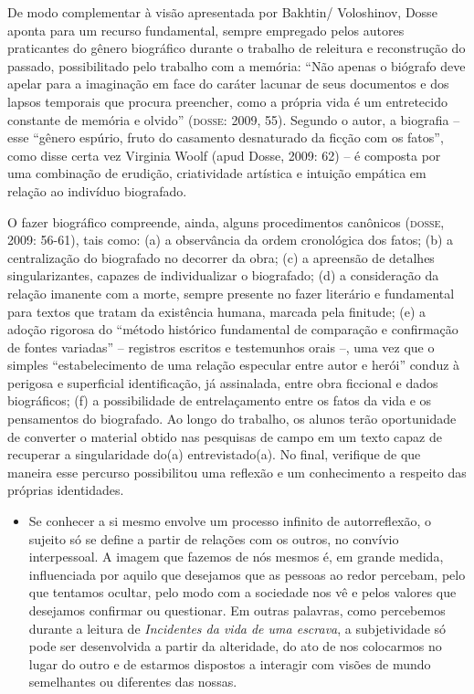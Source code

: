 \documentclass[12pt]{extarticle}
\begin{document}
De modo complementar à visão apresentada por Bakhtin/ Voloshinov, Dosse
aponta para um recurso fundamental, sempre empregado pelos autores
praticantes do gênero biográfico durante o trabalho de releitura e
reconstrução do passado, possibilitado pelo trabalho com a memória: ``Não
apenas o biógrafo deve apelar para a imaginação em face do caráter
lacunar de seus documentos e dos lapsos temporais que procura preencher,
como a própria vida é um entretecido constante de memória e olvido''
(\textsc{dosse}: 2009, 55). Segundo o autor, a biografia -- esse ``gênero espúrio,
fruto do casamento desnaturado da ficção com os fatos'', como disse certa
vez Virginia Woolf (apud Dosse, 2009: 62) -- é composta por uma
combinação de erudição, criatividade artística e intuição empática em
relação ao indivíduo biografado.

O fazer biográfico compreende, ainda, alguns procedimentos canônicos
(\textsc{dosse}, 2009: 56-61), tais como: (a) a observância da ordem cronológica
dos fatos; (b) a centralização do biografado no decorrer da obra; (c) a
apreensão de detalhes singularizantes, capazes de individualizar o
biografado; (d) a consideração da relação imanente com a morte, sempre
presente no fazer literário e fundamental para textos que tratam da
existência humana, marcada pela finitude; (e) a adoção rigorosa do
``método histórico fundamental de comparação e confirmação de fontes
variadas'' -- registros escritos e testemunhos orais --, uma vez que o
simples ``estabelecimento de uma relação especular entre autor e herói''
conduz à perigosa e superficial identificação, já assinalada, entre obra
ficcional e dados biográficos; (f) a possibilidade de entrelaçamento
entre os fatos da vida e os pensamentos do biografado. Ao longo do
trabalho, os alunos terão oportunidade de converter o material obtido
nas pesquisas de campo em um texto capaz de recuperar a singularidade
do(a) entrevistado(a). No final, verifique de que maneira esse percurso
possibilitou uma reflexão e um conhecimento a respeito das próprias
identidades.

\begin{itemize}
\item
  Se conhecer a si mesmo envolve um processo infinito de autorreflexão,
  o sujeito só se define a partir de relações com os outros, no convívio
  interpessoal. A imagem que fazemos de nós mesmos é, em grande medida,
  influenciada por aquilo que desejamos que as pessoas ao redor
  percebam, pelo que tentamos ocultar, pelo modo com a sociedade nos vê
  e pelos valores que desejamos confirmar ou questionar. Em outras
  palavras, como percebemos durante a leitura de \emph{Incidentes da
  vida de uma escrava}, a subjetividade só pode ser desenvolvida a
  partir da alteridade, do ato de nos colocarmos no lugar do outro e de
  estarmos dispostos a interagir com visões de mundo semelhantes ou
  diferentes das nossas.
\end{itemize}
\end{document}

